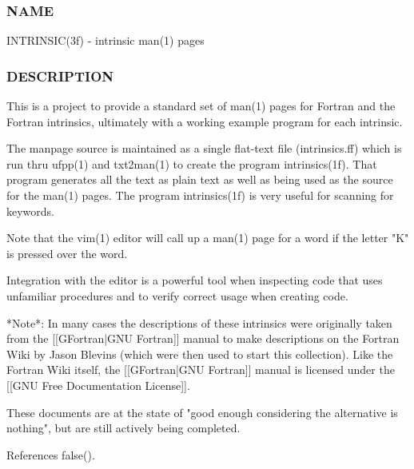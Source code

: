\subsubsection*{N\+A\+ME}

I\+N\+T\+R\+I\+N\+S\+I\+C(3f) -\/ intrinsic man(1) pages 

\subsubsection*{D\+E\+S\+C\+R\+I\+P\+T\+I\+ON}

\begin{DoxyVerb}This is a project to provide a standard set of man(1) pages for Fortran
and the Fortran intrinsics, ultimately with a working example program
for each intrinsic.

The manpage source is maintained as a single flat-text file (intrinsics.ff) which is
run thru ufpp(1) and txt2man(1) to create the program intrinsics(1f).
That program generates all the text as plain text as well as being used
as the source for the man(1) pages. The program intrinsics(1f) is
very useful for scanning for keywords.

Note that the vim(1) editor will call up a man(1) page for a word if
the letter "K" is pressed over the word.

Integration with the editor is a powerful tool when inspecting code
that uses unfamiliar procedures and to verify correct usage when
creating code.

*Note*: In many cases the descriptions of these intrinsics were
originally taken from the [[GFortran|GNU Fortran]] manual to make
descriptions on the Fortran Wiki by Jason Blevins (which were then
used to start this collection). Like the Fortran Wiki itself, the
[[GFortran|GNU Fortran]] manual is licensed under the [[GNU Free
Documentation License]].

These documents are at the state of "good enough considering the
alternative is nothing", but are still actively being completed. \end{DoxyVerb}
 

References false().

